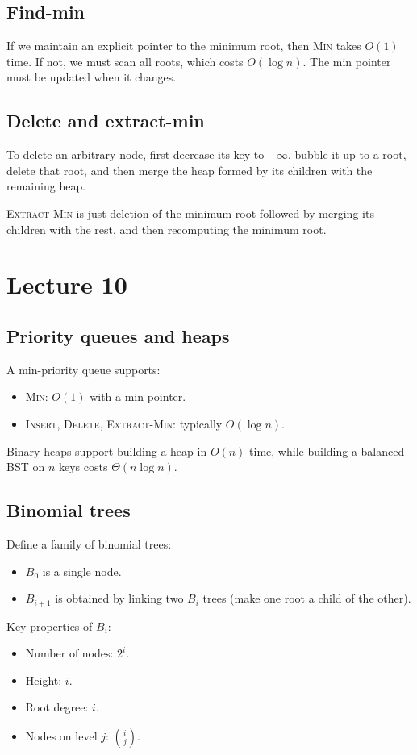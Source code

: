\documentclass[11pt]{article}
\begin{document}
{{{{\subsection*{Find-min}
If we maintain an explicit pointer to the minimum root, then \textsc{Min} takes $O(1)$ time. If not,
we must scan all roots, which costs $O(\log n)$. The min pointer must be updated when it changes.

\subsection*{Delete and extract-min}
To delete an arbitrary node, first decrease its key to $-\infty$, bubble it up to a root, delete
that root, and then merge the heap formed by its children with the remaining heap.

\textsc{Extract-Min} is just deletion of the minimum root followed by merging its children with the
rest, and then recomputing the minimum root.

\section{Lecture 10}

\subsection*{Priority queues and heaps}
A min-priority queue supports:
\begin{itemize}
\item \textsc{Min}: $O(1)$ with a min pointer.
\item \textsc{Insert}, \textsc{Delete}, \textsc{Extract-Min}: typically $O(\log n)$.
\end{itemize}
Binary heaps support building a heap in $O(n)$ time, while building a balanced BST on $n$ keys
costs $\Theta(n \log n)$.

\subsection*{Binomial trees}
Define a family of binomial trees:
\begin{itemize}
\item $B_0$ is a single node.
\item $B_{i+1}$ is obtained by linking two $B_i$ trees (make one root a child of the other).
\end{itemize}
Key properties of $B_i$:
\begin{itemize}
\item Number of nodes: $2^i$.
\item Height: $i$.
\item Root degree: $i$.
\item Nodes on level $j$: $\binom{i}{j}$.
\end{itemize}

}}}}
\end{document}
